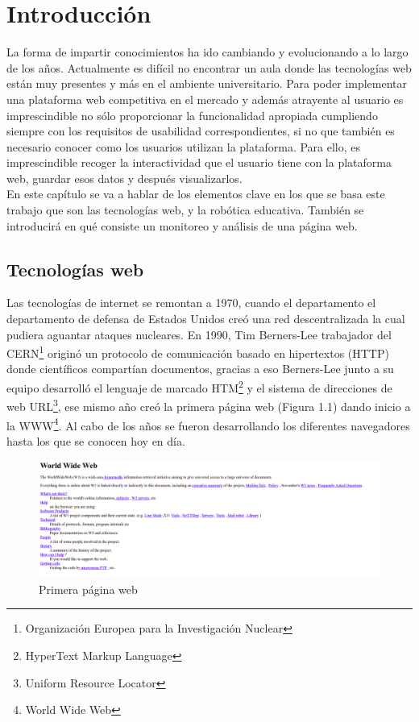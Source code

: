 \chapter{Introducción}
\label{chap:introduccion} 
La forma de impartir conocimientos ha ido cambiando y evolucionando a lo largo de los años. Actualmente es difícil no encontrar un aula donde las tecnologías web están muy presentes y más en el ambiente universitario. Para poder implementar una plataforma web competitiva en el mercado y además atrayente al usuario es imprescindible no sólo proporcionar la funcionalidad apropiada cumpliendo siempre con los requisitos de usabilidad correspondientes, si no que también es necesario conocer como los usuarios utilizan la plataforma. Para ello, es imprescindible recoger la interactividad que el usuario tiene con la plataforma web, guardar esos datos y después visualizarlos.\\

En este capítulo se va a hablar de los elementos clave en los que se basa este trabajo que son las tecnologías web, y la robótica educativa. También se introducirá en qué consiste un monitoreo y análisis de una página web.



\section{Tecnologías web}\label{motivacion}
Las tecnologías de internet se remontan a 1970,  cuando el departamento el departamento de defensa de Estados Unidos creó una red descentralizada la cual pudiera aguantar ataques nucleares. En 1990, Tim Berners-Lee trabajador del CERN\footnote{Organización Europea para la Investigación Nuclear} originó un protocolo de comunicación basado en hipertextos (HTTP) donde científicos compartían documentos, gracias a eso Berners-Lee junto a su equipo desarrolló el lenguaje de marcado HTM\footnote{HyperText Markup Language} y el sistema de direcciones de web URL\footnote{Uniform Resource Locator}, ese mismo año creó la primera página web (Figura 1.1) dando inicio a la WWW\footnote{World Wide Web}. Al cabo de los años se fueron desarrollando los diferentes navegadores hasta los que se conocen hoy en día. \\

\begin{figure}[H]
    \centering
    \includegraphics[width=16cm, keepaspectratio]{img/first_web_page.png}
    \caption{Primera página web}
    \label{fig:web}
\end{figure}

